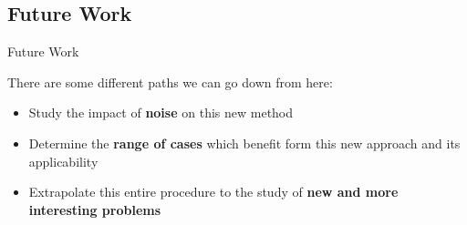\documentclass[9pt, handout, aspectratio=169]{beamer}		%
\begin{document}

	\subsection{Future Work}

	\begin{frame}{Future Work}

		There are some different paths we can go down from here:

		\begin{itemize}
			\item Study the impact of \textbf{noise} on this new method
			\item Determine the \textbf{range of cases} which benefit form this new approach and its applicability
			\item Extrapolate this entire procedure to the study of \textbf{new and more interesting problems}
		\end{itemize}

	\end{frame}

\end{document}
